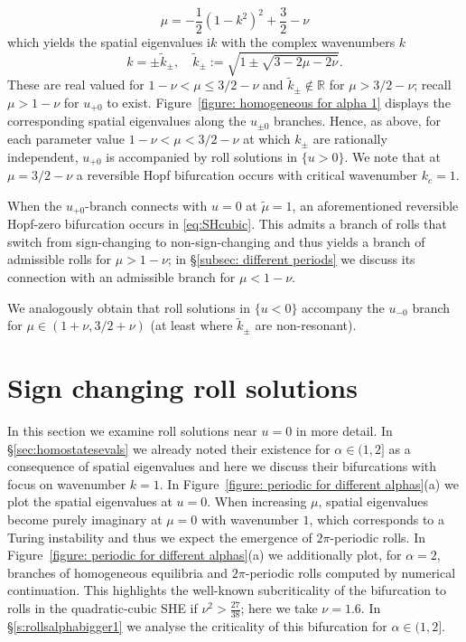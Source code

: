 \documentclass{article}
\numberwithin{equation}{section}
\def\R{\mathbb{R}}
\def\rmi{\mathrm{i}}
\begin{document}
		\begin{equation}\label{eq:u_+0 char eq}
			\mu = -\frac{1}{2} (1-k^2)^2 + \frac{3}{2} - \nu
			\end{equation}
which yields the spatial eigenvalues $\rmi k$ with the complex wavenumbers $k$ 
\begin{equation}
k = \pm \tilde k_\pm, \quad \tilde k_\pm:=\sqrt{1 \pm \sqrt{3-2\mu-2\nu} }.
\end{equation} 
These are real valued for $1-\nu < \mu \leq 3/2-\nu$ and $\tilde k_\pm\notin\R$ for $\mu> 3/2-\nu$; recall $\mu>1-\nu$ for $u_{+0}$ to exist. Figure~\ref{figure: homogeneous for alpha 1} displays the corresponding spatial eigenvalues along the $u_{\pm0}$ branches. 
Hence, as above, for each parameter value $1-\nu < \mu < 3/2-\nu$ at which $k_\pm$ are rationally independent, $u_{+0}$ is accompanied by roll solutions in $\{u>0\}$. We note that at $\mu = 3/2-\nu$ a reversible Hopf bifurcation occurs with critical wavenumber $k_c=1$.

When the $u_{+0}$-branch connects with $u=0$ at $\tilde\mu=1$, an aforementioned reversible Hopf-zero bifurcation occurs in \eqref{eq:SHcubic}. This admits a branch of rolls that switch from sign-changing to non-sign-changing \cite[\S 4.3.1]{HaragusIooss} and thus yields a branch of admissible rolls for $\mu>1-\nu$; in \S\ref{subsec: different periods} we discuss its connection with an admissible branch for $\mu<1-\nu$.

We analogously obtain that roll solutions in $\{u<0\}$ accompany the $u_{-0}$ branch for $\mu \in (1+\nu,3/2+\nu)$ (at least where $\tilde k_\pm$ are non-resonant). 
				
			
\section{Sign changing roll solutions}\label{sec:rolls}
	
In this section we examine roll solutions near $u=0$ in more detail. In \S\ref{sec:homostatesevals} we already noted their existence for $\alpha\in (1,2]$ as a consequence of spatial eigenvalues and here we discuss their bifurcations with focus on wavenumber $k=1$. In Figure~\ref{figure: periodic for different alphas}(a) we plot the spatial eigenvalues at $u=0$. When increasing $\mu$, spatial eigenvalues become purely imaginary at $\mu=0$ with wavenumber $1$, which corresponds to a Turing instability and thus we expect the emergence of $2\pi$-periodic rolls. In Figure~\ref{figure: periodic for different alphas}(a) we additionally plot, for $\alpha=2$, branches of homogeneous equilibria and $2\pi$-periodic rolls computed by numerical continuation. This highlights the well-known subcriticality of the bifurcation to rolls in the quadratic-cubic SHE if $\nu^2 >\frac{27}{38}$; here we take $\nu=1.6$. In \S\ref{s:rollsalphabigger1} we analyse the criticality of this bifurcation for $\alpha\in(1,2]$. 
\end{document}
